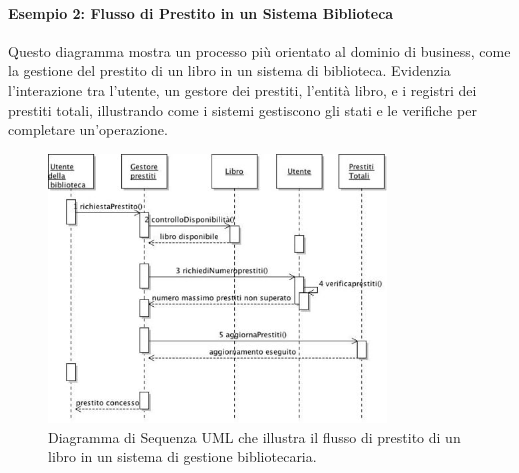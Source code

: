 \paragraph{Esempio 2: Flusso di Prestito in un Sistema Biblioteca}
Questo diagramma mostra un processo più orientato al dominio di business, come la gestione del prestito di un libro in un sistema di biblioteca. Evidenzia l'interazione tra l'utente, un gestore dei prestiti, l'entità libro, e i registri dei prestiti totali, illustrando come i sistemi gestiscono gli stati e le verifiche per completare un'operazione.
\begin{figure}[h!]
    \centering
    \includegraphics[width=0.8\textwidth]{immagini/uml_sequence_prestito_biblioteca.jpg} %
    \caption{Diagramma di Sequenza UML che illustra il flusso di prestito di un libro in un sistema di gestione bibliotecaria.}
    \label{fig:diagramma_sequenza_prestito_biblioteca}
\end{figure}
